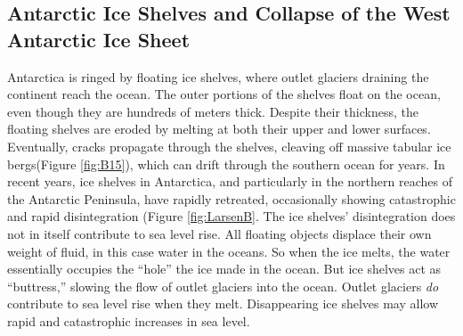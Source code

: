 \documentclass[amstex,12pt]{book}
\begin{document}
\subsection{Antarctic Ice Shelves and Collapse of the West Antarctic Ice Sheet}
Antarctica is ringed by floating ice shelves, where outlet glaciers draining the continent reach the ocean. The outer portions of the shelves float on the ocean, even though they are hundreds of meters thick. Despite their thickness, the floating shelves are eroded by melting at both their upper and lower surfaces. Eventually, cracks propagate through the shelves, cleaving off massive tabular ice bergs(Figure \ref{fig:B15}), which can drift through the southern ocean for years. In recent years, ice shelves in Antarctica, and particularly in the northern reaches of the Antarctic Peninsula, have rapidly retreated, occasionally showing catastrophic and rapid disintegration (Figure \ref{fig:LarsenB}. The ice shelves' disintegration does not in itself contribute to sea level rise. All floating objects displace their own weight of fluid, in this case water in the oceans. So when the ice melts, the water essentially occupies the ``hole'' the ice made in the ocean. But ice shelves act as ``buttress,'' slowing the flow of outlet glaciers into the ocean. Outlet glaciers \emph{do} contribute to sea level rise when they melt. Disappearing ice shelves may allow rapid and catastrophic increases in sea level.\\
\end{document}
